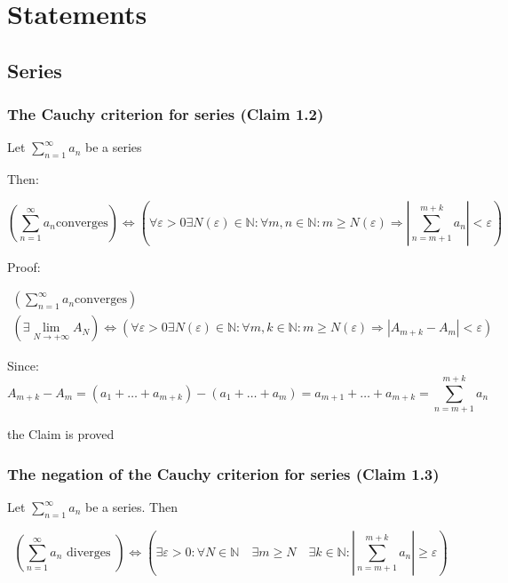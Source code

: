 \section{Statements}

\subsection{Series}

\subsubsection{The Cauchy criterion for series (Claim 1.2)}

Let \(\sum_{n = 1}^{\infty} a_n\) be a series

Then:

\[
    \left( \sum_{n = 1}^{\infty}a_n \text{converges} \right) \Leftrightarrow \left( \forall \varepsilon > 0 \exists N\left( \varepsilon \right) \in \mathbb{N}: \forall m, n \in \mathbb{N}: m \geq N\left( \varepsilon \right) \Rightarrow\left| \sum_{n = m + 1}^{m + k} a_n \right| < \varepsilon \right)
\]

Proof:

\begin{gather*}
    \left( \sum_{n = 1}^{\infty}a_n \text{converges} \right)\\
    \left( \exists \lim_{N \rightarrow + \infty} A_N \right) \Leftrightarrow \left( \forall \varepsilon > 0 \exists N\left( \varepsilon\right) \in \mathbb{N} : \forall m, k \in \mathbb{N}: m \geq N\left( \varepsilon \right) \Rightarrow\left| A_{m + k} - A_m \right| < \varepsilon \right)
\end{gather*}

Since:
\[
    A_{m + k} - A_m = \left( a_1 + \dots + a_{m + k} \right) - \left( a_1 + \dots + a_m \right) = a_{m + 1} + \dots + a_{m + k} = \sum_{n = m + 1}^{m + k} a_n
\]

the Claim is proved

\subsubsection{The negation of the Cauchy criterion for series (Claim 1.3)}

Let \(\sum_{n=1}^{\infty} a_n\) be a series. Then

\[
    \left(\sum_{n=1}^{\infty} a_n \text { diverges }\right) \Leftrightarrow \left(\exists \varepsilon>0: \forall N \in \mathbb{N} \quad \exists m \geqslant N \quad \exists k \in \mathbb{N}:\left|\sum_{n=m+1}^{m+k} a_n\right| \geqslant \varepsilon\right)
\]

